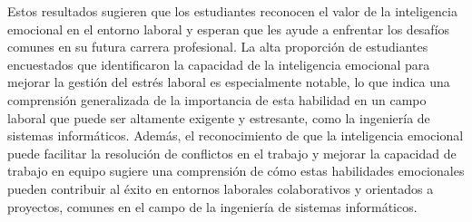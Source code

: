 \documentclass[journal]{IEEEtran}
\begin{document}
\begin{enumerate}
{Estos resultados sugieren que los estudiantes reconocen el valor de la inteligencia emocional en el entorno laboral y esperan que les ayude a enfrentar los desafíos comunes en su futura carrera profesional.
La alta proporción de estudiantes encuestados que identificaron la capacidad de la inteligencia emocional para mejorar la gestión del estrés laboral es especialmente notable, lo que indica una comprensión generalizada de la importancia de esta habilidad en un campo laboral que puede ser altamente exigente y estresante, como la ingeniería de sistemas informáticos.
Además, el reconocimiento de que la inteligencia emocional puede facilitar la resolución de conflictos en el trabajo y mejorar la capacidad de trabajo en equipo sugiere una comprensión de cómo estas habilidades emocionales pueden contribuir al éxito en entornos laborales colaborativos y orientados a proyectos, comunes en el campo de la ingeniería de sistemas informáticos.
}\\


\end{enumerate}
\end{document}
